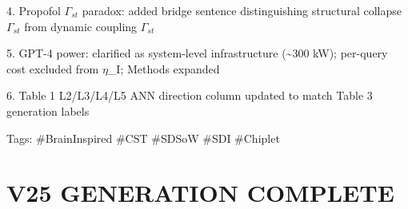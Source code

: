 \documentclass[a4paper,12pt]{article}
\begin{document}
4. Propofol $\Gamma_{st}$ paradox: added bridge sentence distinguishing structural collapse $\Gamma_{st}$ from dynamic coupling $\Gamma_{st}$

5. GPT-4 power: clarified as system-level infrastructure (\textasciitilde{}300 kW); per-query cost excluded from $\eta$\_I; Methods expanded

6. Table 1 L2/L3/L4/L5 ANN direction column updated to match Table 3 generation labels

Tags: \#BrainInspired \#CST \#SDSoW \#SDI \#Chiplet

\section*{V25 GENERATION COMPLETE}
\end{document}
